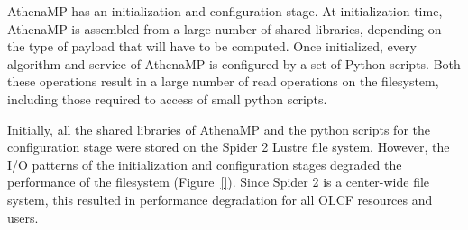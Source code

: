 AthenaMP has an initialization and configuration stage. At initialization time,
AthenaMP is assembled from a large number of shared libraries, depending on the
type of payload that will have to be computed. Once initialized, every algorithm
and service of AthenaMP is configured by a set of Python scripts. Both these
operations result in a large number of read operations on the filesystem,
including those required to access of small python scripts.





Initially, all the shared
libraries of AthenaMP and the python scripts for the configuration stage were
stored on the Spider 2 Lustre file system. However, the I/O patterns of the
initialization and configuration stages degraded the performance of the
filesystem (Figure~\ref{}). Since Spider 2 is a center-wide file system,
this resulted in  performance degradation for all OLCF resources and users.

